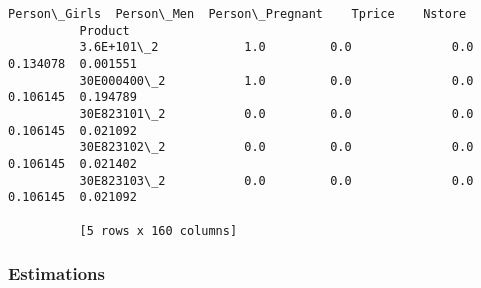 \documentclass[11pt]{article}
\begin{document}
\begin{Verbatim}[commandchars=\\\{\}]
                       Person\_Girls  Person\_Men  Person\_Pregnant    Tprice    Nstore  
          Product                                                                     
          3.6E+101\_2            1.0         0.0              0.0  0.134078  0.001551  
          30E000400\_2           1.0         0.0              0.0  0.106145  0.194789  
          30E823101\_2           0.0         0.0              0.0  0.106145  0.021092  
          30E823102\_2           0.0         0.0              0.0  0.106145  0.021402  
          30E823103\_2           0.0         0.0              0.0  0.106145  0.021092  
          
          [5 rows x 160 columns]
\end{Verbatim}
            
    \subsubsection{Estimations}\label{estimations}
\end{document}
